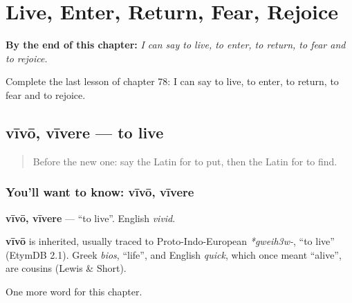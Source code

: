 
\chapter{Live, Enter, Return, Fear, Rejoice}
\label{ch:la-live-enter-return-fear-rejoice}

\begin{chapteropening}
\textbf{By the end of this chapter:} \emph{I can say to live, to enter, to return, to fear and to rejoice.}

Complete the last lesson of chapter 78: I can say to live, to enter, to return, to fear and to rejoice.
\end{chapteropening}

\section[vīvō, vīvere]{vīvō, vīvere — to live}

\label{lesson:LA-C78-vivo}



\begin{quote}
Before the new one: say the Latin for to put, then the Latin for to find.
\end{quote}

\subsection*{You'll want to know: vīvō, vīvere}
\textbf{vīvō, vīvere} — \textquotedblleft{}to live\textquotedblright{}. English \emph{vivid}.

\begin{cousinweb}
\textbf{vīvō} is inherited, usually traced to Proto-Indo-European \emph{*gweih3w-}, \textquotedblleft{}to live\textquotedblright{} (EtymDB 2.1). Greek \emph{bios}, \textquotedblleft{}life\textquotedblright{}, and English \emph{quick}, which once meant \textquotedblleft{}alive\textquotedblright{}, are cousins (Lewis \& Short).
\end{cousinweb}

\begin{grammarlens}[title={What you've built}]
One more word for this chapter.
\end{grammarlens}

